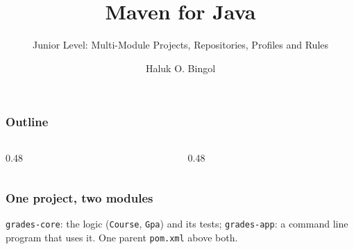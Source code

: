 \documentclass[aspectratio=169,10pt,compress]{beamer}
\title{Maven for Java}
\subtitle{Junior Level: Multi-Module Projects, Repositories, Profiles and Rules}
\author[Bingol]{Haluk O. Bingol}
\institute[FCIS]{
    Faculty of Computer and Information Sciences\\
    Yeditepe University
}
\date{
	{\tiny \hbTimeStamp}
}
\begin{document}
\begin{frame}[t,fragile]
  \titlepage
\end{frame}




\begin{frame}[t,fragile] \frametitle{Outline}
  \begin{columns}[T]
    \begin{column}{0.48\textwidth}
      \tableofcontents[sections={1-4}, hideallsubsections]
    \end{column}
    \begin{column}{0.48\textwidth}
      \tableofcontents[sections={5-8}, hideallsubsections]
    \end{column}
  \end{columns}
\end{frame}





\begin{frame}[t,fragile] \frametitle{One project, two modules}

  \vspace{0.1em}
  \small
  \texttt{grades-core}: the logic (\texttt{Course}, \texttt{Gpa}) and its tests; \texttt{grades-app}: a command line program that uses it. One parent \texttt{pom.xml} above both.
\end{frame}
\end{document}

